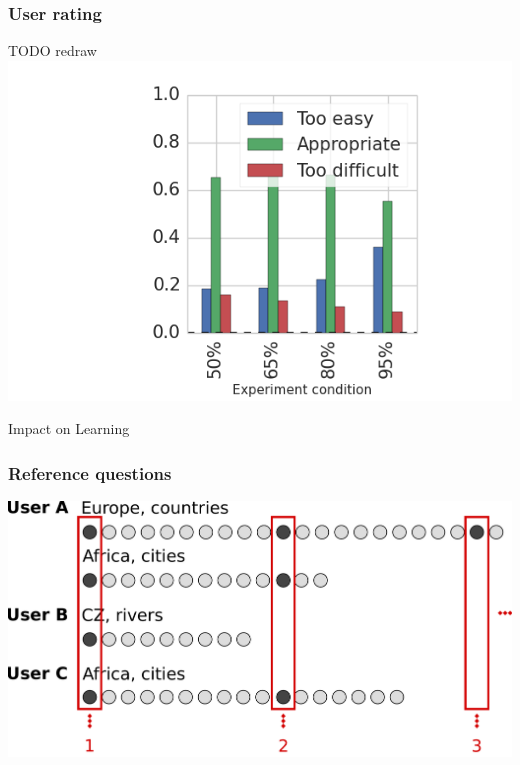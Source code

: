 \documentclass[bigger]{beamer}
\begin{document}
\begin{frame}
  \frametitle{User rating}
  TODO redraw
  \includegraphics[width=\textwidth]{img/rating_by_divider_ab_school_divider_target_difficulty_answers}
\end{frame}

\begin{frame}
	\begin{center}
    {\Huge Impact on Learning} 
	\end{center}
\end{frame}


\begin{frame}
  \frametitle{Reference questions}
  \includegraphics[width=\textwidth]{img/reference_answers_learning}
\end{frame}
\end{document}
